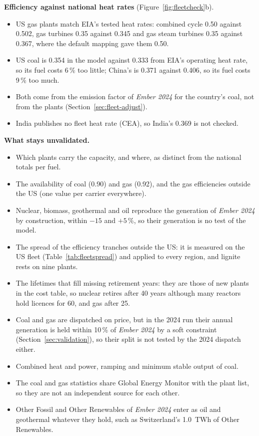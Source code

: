 \textbf{Efficiency against national heat rates} (Figure~\ref{fig:fleetcheck}b).
\begin{itemize}[nosep,leftmargin=*]
  \item US gas plants match EIA's tested heat rates: combined cycle 0.50 against 0.502, gas turbines 0.35 against 0.345 and gas steam turbines 0.35 against 0.367, where the default mapping gave them 0.50.
  \item US coal is 0.354 in the model against 0.333 from EIA's operating heat rate, so its fuel costs 6\,\% too little; China's is 0.371 against 0.406, so its fuel costs 9\,\% too much.
  \item Both come from the emission factor of \textit{Ember 2024} for the country's coal, not from the plants (Section~\ref{sec:fleet-adjust}).
  \item India publishes no fleet heat rate (CEA), so India's 0.369 is not checked.
\end{itemize}

\textbf{What stays unvalidated.}
\begin{itemize}[nosep,leftmargin=*]
  \item Which plants carry the capacity, and where, as distinct from the national totals per fuel.
  \item The availability of coal (0.90) and gas (0.92), and the gas efficiencies outside the US (one value per carrier everywhere).
  \item Nuclear, biomass, geothermal and oil reproduce the generation of \textit{Ember 2024} by construction, within $-15$ and $+5$\,\%, so their generation is no test of the model.
  \item The spread of the efficiency tranches outside the US: it is measured on the US fleet (Table~\ref{tab:fleetspread}) and applied to every region, and lignite rests on nine plants.
  \item The lifetimes that fill missing retirement years: they are those of new plants in the cost table, so nuclear retires after 40 years although many reactors hold licences for 60, and gas after 25.
  \item Coal and gas are dispatched on price, but in the 2024 run their annual generation is held within 10\,\% of \textit{Ember 2024} by a soft constraint (Section~\ref{sec:validation}), so their split is not tested by the 2024 dispatch either.
  \item Combined heat and power, ramping and minimum stable output of coal.
  \item The coal and gas statistics share Global Energy Monitor with the plant list, so they are not an independent source for each other.
  \item Other Fossil and Other Renewables of \textit{Ember 2024} enter as oil and geothermal whatever they hold, such as Switzerland's \SI{1.0}{TWh} of Other Renewables.
\end{itemize}
